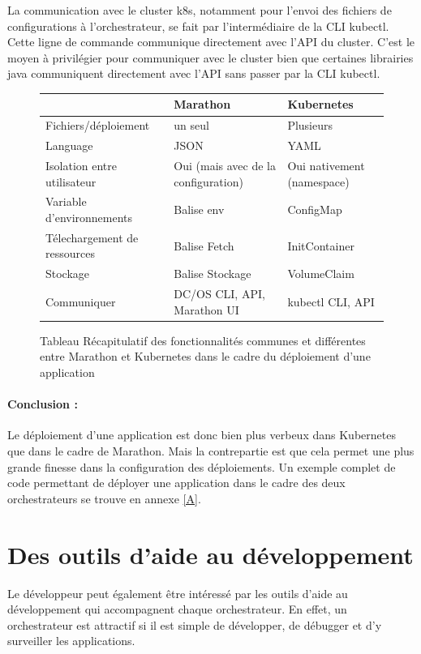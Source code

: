 \documentclass[11pt,fleqn]{book} %
\begin{document}
La communication avec le cluster k8s, notamment pour l'envoi des fichiers de configurations à l'orchestrateur, se fait par l'intermédiaire de la CLI kubectl. Cette ligne de commande communique directement avec l'API du cluster. C'est le moyen à privilégier pour communiquer avec le cluster bien que certaines librairies java communiquent directement avec l'API sans passer par la CLI kubectl.

\begin{figure}[H]\centering
\begin{tabular}{@{}lll@{}}
\toprule
                             & Marathon       & Kubernetes      \\ \midrule
Fichiers/déploiement         & un seul         & Plusieurs       \\
Language                     & JSON           & YAML            \\
Isolation entre utilisateur & Oui (mais avec de la configuration)            & Oui nativement (namespace) \\
Variable d'environnements    & Balise env     & ConfigMap       \\
Télechargement de ressources & Balise Fetch   & InitContainer   \\
Stockage                     & Balise Stockage & VolumeClaim     \\
Communiquer & DC/OS CLI, API, Marathon UI & kubectl CLI, API\\
\bottomrule
\end{tabular}
\caption{Tableau Récapitulatif des fonctionnalités communes et différentes entre Marathon et Kubernetes dans le cadre du déploiement d'une application}
\label{tab:my-table}
\end{figure}


\begin{interrupt}
\paragraph{Conclusion :}
Le déploiement d'une application est donc bien plus verbeux dans Kubernetes que dans le cadre de Marathon. Mais la contrepartie est que cela permet une plus grande finesse dans la configuration des déploiements. Un exemple complet de code permettant de déployer une application dans le cadre des deux orchestrateurs se trouve en annexe \ref{A}.
\end{interrupt}

\section{Des outils d'aide au développement}
Le développeur peut également être intéressé par les outils d'aide au développement qui accompagnent chaque orchestrateur. En effet, un orchestrateur est attractif si il est simple de développer, de débugger et d'y surveiller les applications.\\
\end{document}
